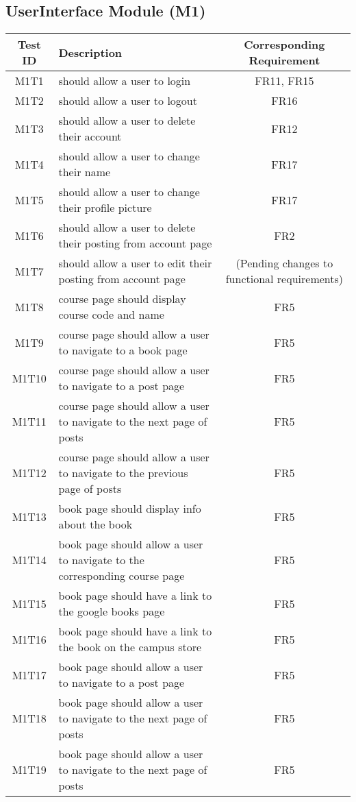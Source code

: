 \documentclass[fullpage]{article}
\begin{document}
\subsection{UserInterface Module (M1)}
\begin{table}[H]
\flushleft
\begin{tabular}{|c|p{8.5cm}|c|}
\hline
 \rowcolor{lightgray} 
\textbf{Test ID} &\textbf{Description} &\textbf{Corresponding Requirement}\\
\hline
M1T1 & should allow a user to login & FR11, FR15 \\
\hline
M1T2 & should allow a user to logout & FR16 \\
\hline
M1T3 & should allow a user to delete their account & FR12 \\
\hline
M1T4 & should allow a user to change their name & FR17 \\
\hline
M1T5 & should allow a user to change their profile picture & FR17 \\
\hline
M1T6 & should allow a user to delete their posting from account page & FR2 \\
\hline
M1T7 & should allow a user to edit their posting from account page & (Pending changes to functional requirements) \\
\hline
M1T8 & course page should display course code and name & FR5 \\
\hline
M1T9 & course page should allow a user to navigate to a book page & FR5 \\
\hline
M1T10 & course page should allow a user to navigate to a post page & FR5 \\
\hline
M1T11 & course page should allow a user to navigate to the next page of posts & FR5 \\
\hline
M1T12 & course page should allow a user to navigate to the previous page of posts & FR5 \\
\hline
M1T13 & book page should display info about the book & FR5 \\
\hline
M1T14 & book page should allow a user to navigate to the corresponding course page & FR5 \\
\hline
M1T15 & book page should have a link to the google books page & FR5 \\
\hline
M1T16 & book page should have a link to the book on the campus store & FR5 \\
\hline
M1T17 & book page should allow a user to navigate to a post page & FR5 \\
\hline
M1T18 & book page should allow a user to navigate to the next page of posts & FR5 \\
\hline
M1T19 & book page should allow a user to navigate to the next page of posts & FR5 \\
\hline
\end{tabular}
\end{table}
\end{document}
